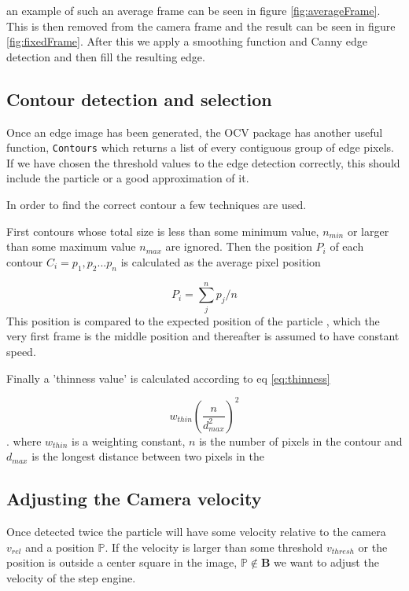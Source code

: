 an example of such an average frame can be seen in figure \ref{fig:averageFrame}. This is then removed from the camera frame and the result can be seen in figure \ref{fig:fixedFrame}. After this we apply a smoothing function and Canny edge detection \cite{Canny} and then fill the resulting edge. 

\subsection{Contour detection and selection}

Once an edge image has been generated, the OCV package has another useful function, \texttt{Contours} which returns a list of every contiguous group of edge pixels. If we have chosen the threshold values to the edge detection correctly, this should include the particle or a good approximation of it. 

In order to find the correct contour  a few techniques are used.

First contours whose total size is less than some minimum value, $ n_{min}$ or larger than some maximum value $n_{max}$ are ignored. Then the position $P_i$ of each contour $C_i={p_1,p_2...p_n}$ is calculated as the average pixel position

\[
P_i = \sum_{j}^n p_j/n
\]
This position is compared to the expected position of the particle , which the very first frame is the middle position and thereafter is assumed to have constant speed. 

Finally a 'thinness value' is calculated according to eq \ref{eq:thinness}

\begin{equation}\label{eq:thinness}
w_{thin}\left(\frac{ n}{d_{max}^2}\right)^2
\end{equation}. 
where $w_{thin}$ is a weighting constant, $n$ is the number of pixels in the contour and $d_{max}$ is the longest distance between two pixels in the 

\subsection{Adjusting the Camera velocity}
Once detected twice the particle will have some velocity relative to the camera $v_{rel}$ and a position $\mathbb{P}$. 
If the velocity is larger than some threshold $v_{thresh}$ or the position is outside a center square in the image, $\mathbb{P} \not \in \mathbf{B}$ we want to adjust the velocity of the step engine. 

